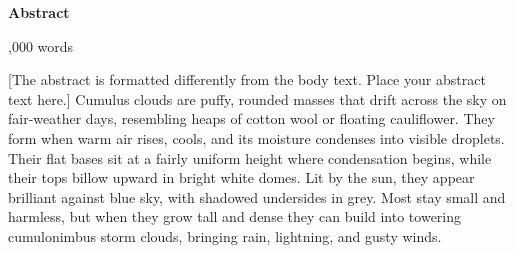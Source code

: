 \cleardoublepage
{}
{}
\begin{center}\bfseries Abstract\end{center}
\begin{center},000 words\end{center}

\begingroup
{}

[The abstract is formatted differently from the body text. Place your abstract text here.] Cumulus clouds are puffy, rounded masses that drift across the sky on fair-weather days, resembling heaps of cotton wool or floating cauliflower. They form when warm air rises, cools, and its moisture condenses into visible droplets. Their flat bases sit at a fairly uniform height where condensation begins, while their tops billow upward in bright white domes. Lit by the sun, they appear brilliant against blue sky, with shadowed undersides in grey. Most stay small and harmless, but when they grow tall and dense they can build into towering cumulonimbus storm clouds, bringing rain, lightning, and gusty winds.\par

\endgroup

\cleardoublepage